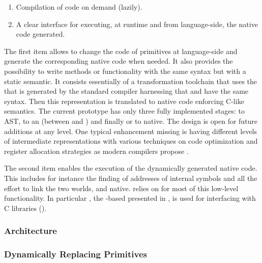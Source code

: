 \begin{enumerate}
	\item Compilation of \Slang code on demand (lazily).
	\item A clear interface for executing, at runtime and from language-side, the native code generated.
\end{enumerate}

\noindent The first item allows to change the code of primitives at language-side and generate the corresponding native code when needed. 
It also provides the possibility to write methods or functionality with the same \ST syntax but with a static semantic. 
It consists essentially of a transformation toolchain that uses the \AST that is generated by the standard \PH compiler harnessing that \Slang and \ST have the same syntax. 
Then this \AST representation is translated to native code enforcing C-like \Slang semantics. The current prototype has only three fully implemented stages: \Slang to AST, \AST to an \IR (between \TAC and \SSA) and finally \AST or \IR to native.
The design is open for future additions at any level.
One typical enhancement missing is having different levels of intermediate representations with various techniques on code optimization and register allocation strategies as modern compilers propose \cite[Ch.\ 1]{Appe98a}. 

The second item enables the execution of the dynamically generated native code.
This includes for instance the finding of addresses of \VM internal symbols and all the effort to link the two worlds, \ST and native.
\WF relies on \B for most of this low-level functionality.
In particular \NB, the \B-based \FFI presented in , is used for interfacing with C libraries (). 

\subsubsection*{Architecture}

\subsubsection*{Dynamically Replacing Primitives}

